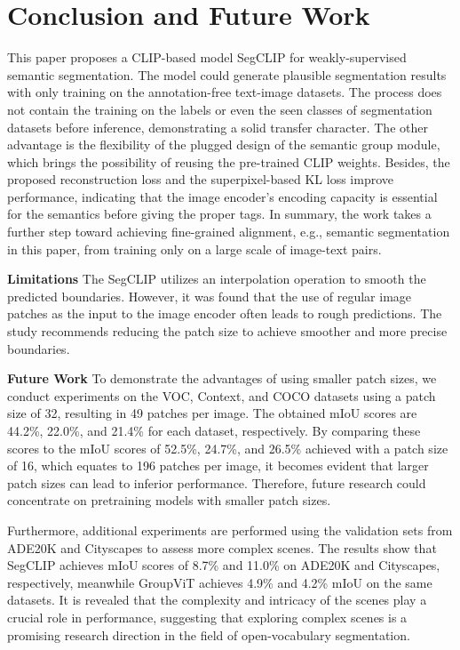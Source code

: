 \documentclass{article}
\theoremstyle{plain}
\theoremstyle{definition}
\theoremstyle{remark}
\begin{document}
\section{Conclusion and Future Work}
\label{sec_conclusion}
This paper proposes a CLIP-based model SegCLIP for weakly-supervised semantic segmentation. The model could generate plausible segmentation results with only training on the annotation-free text-image datasets. The process does not contain the training on the labels or even the seen classes of segmentation datasets before inference, demonstrating a solid transfer character. The other advantage is the flexibility of the plugged design of the semantic group module, which brings the possibility of reusing the pre-trained CLIP weights. Besides, the proposed reconstruction loss and the superpixel-based KL loss improve performance, indicating that the image encoder's encoding capacity is essential for the semantics before giving the proper tags. In summary, the work takes a further step toward achieving fine-grained alignment, e.g., semantic segmentation in this paper, from training only on a large scale of image-text pairs.

\vspace{0.1cm}
\noindent
\textbf{Limitations} \quad The SegCLIP utilizes an interpolation operation to smooth the predicted boundaries. However, it was found that the use of regular image patches as the input to the image encoder often leads to rough predictions. The study recommends reducing the patch size to achieve smoother and more precise boundaries. 

\vspace{0.1cm}
\noindent
\textbf{Future Work} \quad To demonstrate the advantages of using smaller patch sizes, we conduct experiments on the VOC, Context, and COCO datasets using a patch size of 32, resulting in 49 patches per image. The obtained mIoU scores are 44.2\%, 22.0\%, and 21.4\% for each dataset, respectively. By comparing these scores to the mIoU scores of 52.5\%, 24.7\%, and 26.5\% achieved with a patch size of 16, which equates to 196 patches per image, it becomes evident that larger patch sizes can lead to inferior performance. Therefore, future research could concentrate on pretraining models with smaller patch sizes. 

Furthermore, additional experiments are performed using the validation sets from ADE20K \cite{Zhou2017scene} and Cityscapes \cite{Cordts2016cityscapes} to assess more complex scenes. The results show that SegCLIP achieves mIoU scores of 8.7\% and 11.0\% on ADE20K and Cityscapes, respectively, meanwhile GroupViT achieves 4.9\% and 4.2\% mIoU on the same datasets. It is revealed that the complexity and intricacy of the scenes play a crucial role in performance, suggesting that exploring complex scenes is a promising research direction in the field of open-vocabulary segmentation.
\end{document}

